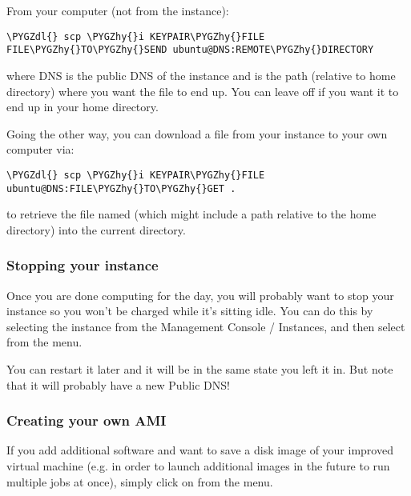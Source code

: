 \documentclass[letterpaper,10pt,english]{sphinxmanual}
\def\PYGZdl{\char`\$}
\def\PYGZhy{\char`\-}
\begin{document}
From your computer (not from the instance):

\begin{Verbatim}[commandchars=\\\{\}]
\PYGZdl{} scp \PYGZhy{}i KEYPAIR\PYGZhy{}FILE FILE\PYGZhy{}TO\PYGZhy{}SEND ubuntu@DNS:REMOTE\PYGZhy{}DIRECTORY
\end{Verbatim}

where DNS is the public DNS of the instance and  is
the path (relative to home directory)
where you want the file to end up.  You can leave off
 if you want it to end up in your home directory.

Going the other way, you can download a file from your instance to
your own computer via:

\begin{Verbatim}[commandchars=\\\{\}]
\PYGZdl{} scp \PYGZhy{}i KEYPAIR\PYGZhy{}FILE ubuntu@DNS:FILE\PYGZhy{}TO\PYGZhy{}GET .
\end{Verbatim}

to retrieve the file named  (which might include a path
relative to the home directory) into the current directory.


\subsubsection{Stopping your instance}
\label{2013/aws:stopping-your-instance}
Once you are done computing for the day, you will probably want to stop your
instance so you won't be charged while it's sitting idle.  You can do this
by selecting the instance from the Management Console / Instances, and then
select  from the  menu.

You can restart it later and it will be in the same state you left it in.
But note that it will probably have a new Public DNS!


\subsubsection{Creating your own AMI}
\label{2013/aws:creating-your-own-ami}
If you add additional software and want to save a disk image of your
improved virtual machine (e.g. in order to launch additional images in the
future to run multiple jobs at once), simply click on  from the  menu.
\end{document}

